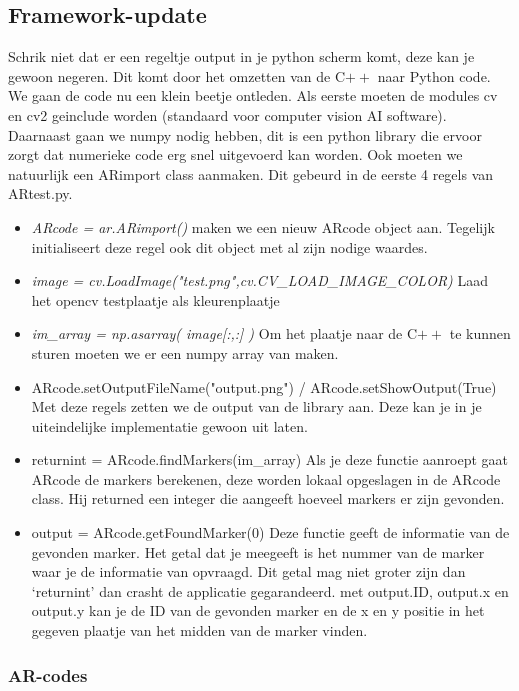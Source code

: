 \documentclass[a4paper, twoside]{article}
\begin{document}
\subsection{Framework-update}
Schrik niet dat er een regeltje output in je python scherm komt, deze kan je gewoon negeren. Dit komt door het omzetten van de C$\stackrel{}{++}$ naar Python code. 
We gaan de code nu een klein beetje ontleden. Als eerste moeten de modules cv en cv2 geinclude worden (standaard voor computer vision AI software). Daarnaast gaan we numpy nodig hebben, dit is een python library die ervoor zorgt dat numerieke code erg snel uitgevoerd kan worden. Ook moeten we natuurlijk een ARimport class aanmaken. Dit gebeurd in de eerste 4 regels van ARtest.py.
\begin{itemize}
\item \emph{ARcode = ar.ARimport()} maken we een nieuw ARcode object aan. Tegelijk initialiseert deze regel ook dit object met al zijn nodige waardes.
\item \emph{image = cv.LoadImage("test.png",cv.CV\_LOAD\_IMAGE\_COLOR)} Laad het opencv testplaatje als kleurenplaatje
\item \emph{im\_array = np.asarray( image[:,:] ) } Om het plaatje naar de C$\stackrel{}{++}$ te kunnen sturen moeten we er een numpy array van maken.
\item{ARcode.setOutputFileName("output.png") / ARcode.setShowOutput(True)} Met deze regels zetten we de output van de library aan. Deze kan je in je uiteindelijke implementatie gewoon uit laten.
\item{returnint = ARcode.findMarkers(im\_array)} Als je deze functie aanroept gaat ARcode de markers berekenen, deze worden lokaal opgeslagen in de ARcode class. Hij returned een integer die aangeeft hoeveel markers er zijn gevonden.
\item{output = ARcode.getFoundMarker(0)} Deze functie geeft de informatie van de gevonden marker. Het getal dat je meegeeft is het nummer van de marker waar je de informatie van opvraagd. Dit getal mag niet groter zijn dan `returnint' dan crasht de applicatie gegarandeerd. met output.ID, output.x en output.y kan je de ID van de gevonden marker en de x en y positie in het gegeven plaatje van het midden van de marker vinden.
\end{itemize}

\subsubsection{AR-codes}
\end{document}
